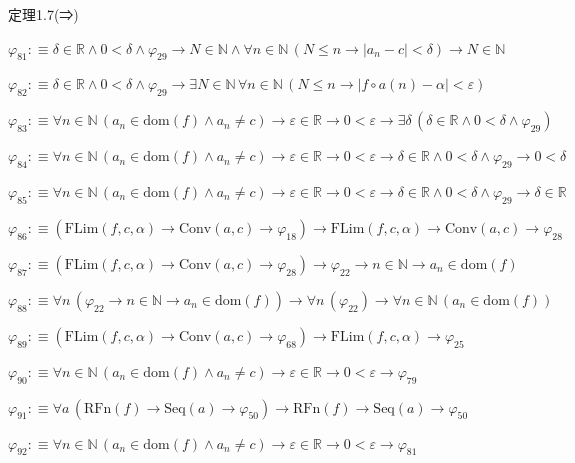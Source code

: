 \begin{fullproof}{定理1.7(⇒)}
\begin{abbrevlist}
\item $\varphi_{81} :\equiv \delta \in \mathbb{R} \land 0 < \delta \land \varphi_{29} \to N \in \mathbb{N} \land \forall n \in \mathbb{N}\,(N \leq n \to \lvert a_{n} - c \rvert < \delta) \to N \in \mathbb{N}$
\item $\varphi_{82} :\equiv \delta \in \mathbb{R} \land 0 < \delta \land \varphi_{29} \to \exists N \in \mathbb{N}\,\forall n \in \mathbb{N}\,(N \leq n \to \lvert f \circ a(n) - \alpha \rvert < \varepsilon)$
\item $\varphi_{83} :\equiv \forall n \in \mathbb{N}\,(a_{n} \in \mathrm{dom}(f) \land a_{n} \neq c) \to \varepsilon \in \mathbb{R} \to 0 < \varepsilon \to \exists \delta\,(\delta \in \mathbb{R} \land 0 < \delta \land \varphi_{29})$
\item $\varphi_{84} :\equiv \forall n \in \mathbb{N}\,(a_{n} \in \mathrm{dom}(f) \land a_{n} \neq c) \to \varepsilon \in \mathbb{R} \to 0 < \varepsilon \to \delta \in \mathbb{R} \land 0 < \delta \land \varphi_{29} \to 0 < \delta$
\item $\varphi_{85} :\equiv \forall n \in \mathbb{N}\,(a_{n} \in \mathrm{dom}(f) \land a_{n} \neq c) \to \varepsilon \in \mathbb{R} \to 0 < \varepsilon \to \delta \in \mathbb{R} \land 0 < \delta \land \varphi_{29} \to \delta \in \mathbb{R}$
\item $\varphi_{86} :\equiv (\mathrm{FLim}(f,c,\alpha) \to \mathrm{Conv}(a,c) \to \varphi_{18}) \to \mathrm{FLim}(f,c,\alpha) \to \mathrm{Conv}(a,c) \to \varphi_{28}$
\item $\varphi_{87} :\equiv (\mathrm{FLim}(f,c,\alpha) \to \mathrm{Conv}(a,c) \to \varphi_{28}) \to \varphi_{22} \to n \in \mathbb{N} \to a_{n} \in \mathrm{dom}(f)$
\item $\varphi_{88} :\equiv \forall n\,(\varphi_{22} \to n \in \mathbb{N} \to a_{n} \in \mathrm{dom}(f)) \to \forall n\,(\varphi_{22}) \to \forall n \in \mathbb{N}\,(a_{n} \in \mathrm{dom}(f))$
\item $\varphi_{89} :\equiv (\mathrm{FLim}(f,c,\alpha) \to \mathrm{Conv}(a,c) \to \varphi_{68}) \to \mathrm{FLim}(f,c,\alpha) \to \varphi_{25}$
\item $\varphi_{90} :\equiv \forall n \in \mathbb{N}\,(a_{n} \in \mathrm{dom}(f) \land a_{n} \neq c) \to \varepsilon \in \mathbb{R} \to 0 < \varepsilon \to \varphi_{79}$
\item $\varphi_{91} :\equiv \forall a\,(\mathrm{RFn}(f) \to \mathrm{Seq}(a) \to \varphi_{50}) \to \mathrm{RFn}(f) \to \mathrm{Seq}(a) \to \varphi_{50}$
\item $\varphi_{92} :\equiv \forall n \in \mathbb{N}\,(a_{n} \in \mathrm{dom}(f) \land a_{n} \neq c) \to \varepsilon \in \mathbb{R} \to 0 < \varepsilon \to \varphi_{81}$

\end{abbrevlist}
\end{fullproof}

